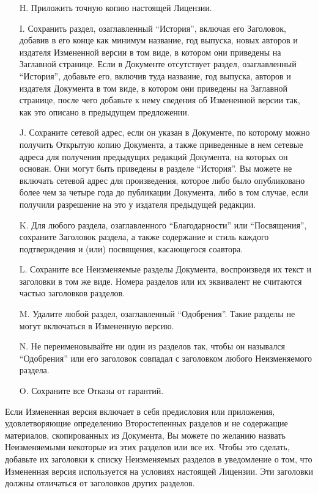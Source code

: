 \begin{itemize}
\item[H.]
Приложить точную копию настоящей Лицензии.

\item[I.]
Сохранить раздел, озаглавленный \enquote{История}, включая его
Заголовок, добавив в его конце как минимум название, год выпуска,
новых авторов и издателя Измененной версии в том виде, в котором они
приведены на Заглавной странице. Если в Документе отсутствует раздел,
озаглавленный \enquote{История}, добавьте его, включив туда название,
год выпуска, авторов и издателя Документа в том виде, в котором они
приведены на Заглавной странице, после чего добавьте к нему сведения
об Измененной версии так, как это описано в предыдущем предложении.

\item[J.]
Сохраните сетевой адрес, если он указан в Документе, по которому можно
получить Открытую копию Документа, а также приведенные в нем сетевые
адреса для получения предыдущих редакций Документа, на которых он
основан. Они могут быть приведены в разделе \enquote{История}. Вы
можете не включать сетевой адрес для произведения, которое либо было
опубликовано более чем за четыре года до публикации Документа, либо в
том случае, если получили разрешение на это у издателя предыдущей
редакции.

\item[K.]
Для любого раздела, озаглавленного \enquote{Благодарности} или
\enquote{Посвящения}, сохраните Заголовок раздела, а также содержание
и стиль каждого подтверждения и (или) посвящения, касающегося
соавтора.

\item[L.]
Сохраните все Неизменяемые разделы Документа, воспроизведя их текст и
заголовки в том же виде. Номера разделов или их эквивалент не
считаются частью заголовков разделов.

\item[M.]
Удалите любой раздел, озаглавленный \enquote{Одобрения}. Такие разделы
не могут включаться в Измененную версию.

\item[N.]
Не переименовывайте ни один из разделов так, чтобы он назывался
\enquote{Одобрения} или его заголовок совпадал с заголовком любого
Неизменяемого раздела.

\item[O.]
Сохраните все Отказы от гарантий.
\end{itemize}

Если Измененная версия включает в себя предисловия или приложения,
удовлетворяющие определению Второстепенных разделов и не содержащие
материалов, скопированных из Документа, Вы можете по желанию назвать
Неизменяемыми некоторые из этих разделов или все их. Чтобы это
сделать, добавьте их заголовки к списку Неизменяемых разделов в
уведомление о том, что Измененная версия используется на условиях
настоящей Лицензии. Эти заголовки должны отличаться от заголовков
других разделов.

